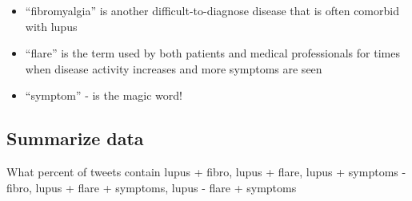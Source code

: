 \documentclass[]{article}
\newenvironment{Shaded}{\begin{snugshade}}{\end{snugshade}}
\newcommand{\DataTypeTok}[1]{\textcolor[rgb]{0.13,0.29,0.53}{#1}}
\newcommand{\KeywordTok}[1]{\textcolor[rgb]{0.13,0.29,0.53}{\textbf{#1}}}
\newcommand{\NormalTok}[1]{#1}
\newcommand{\OperatorTok}[1]{\textcolor[rgb]{0.81,0.36,0.00}{\textbf{#1}}}
\newcommand{\OtherTok}[1]{\textcolor[rgb]{0.56,0.35,0.01}{#1}}
\newcommand{\StringTok}[1]{\textcolor[rgb]{0.31,0.60,0.02}{#1}}
\begin{document}
\begin{itemize}
\item
  ``fibromyalgia'' is another difficult-to-diagnose disease that is
  often comorbid with lupus
\item
  ``flare'' is the term used by both patients and medical professionals
  for times when disease activity increases and more symptoms are seen
\item
  ``symptom'' - is the magic word!
\end{itemize}

\begin{Shaded}
\end{Shaded}

\hypertarget{summarize-data}{%
\subsection{Summarize data}\label{summarize-data}}

What percent of tweets contain lupus + fibro, lupus + flare, lupus +
symptoms - fibro, lupus + flare + symptoms, lupus - flare + symptoms
\end{document}
